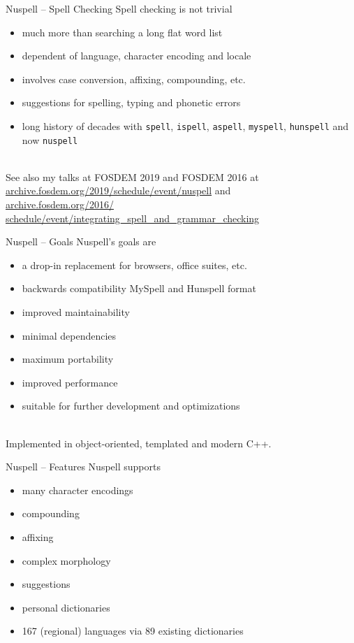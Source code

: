\documentclass{beamer}
\begin{document}
\begin{frame}{Nuspell – Spell Checking}
Spell checking is \alert{not trivial}
\begin{itemize}
\item much more than searching a long flat word list
\item dependent of language, character encoding and locale
\item involves case conversion, affixing, compounding, etc.
\item suggestions for spelling, typing and phonetic errors
\item long history of decades with \texttt{spell}, \texttt{ispell}, \texttt{aspell}, \texttt{myspell}, \texttt{hunspell} and now \texttt{nuspell}
\end{itemize}
\mbox{}\\
See also my talks at FOSDEM 2019 and FOSDEM 2016 at\\
\href{https://archive.fosdem.org/2019/schedule/event/nuspell}{archive.fosdem.org/2019/schedule/event/nuspell} and\\
\href{https://archive.fosdem.org/2016/schedule/event/integrating\_spell\_and\_grammar\_checking}{archive.fosdem.org/2016/\\schedule/event/integrating\_spell\_and\_grammar\_checking}

\end{frame}

\begin{frame}{Nuspell – Goals}
Nuspell's goals are
\begin{itemize}
\item a drop-in replacement for browsers, office suites, etc.
\item backwards compatibility MySpell and Hunspell format
\item improved maintainability
\item minimal dependencies
\item maximum portability
\item improved performance
\item suitable for further development and optimizations
\end{itemize}
\mbox{}\\
Implemented in object-oriented, templated and modern C++.
\end{frame}

\begin{frame}{Nuspell – Features}
Nuspell supports
\begin{itemize}
\item many character encodings
\item compounding
\item affixing
\item complex morphology
\item suggestions
\item personal dictionaries
\item 167 (regional) languages via 89 existing dictionaries
\end{itemize}
\end{frame}
\end{document}
